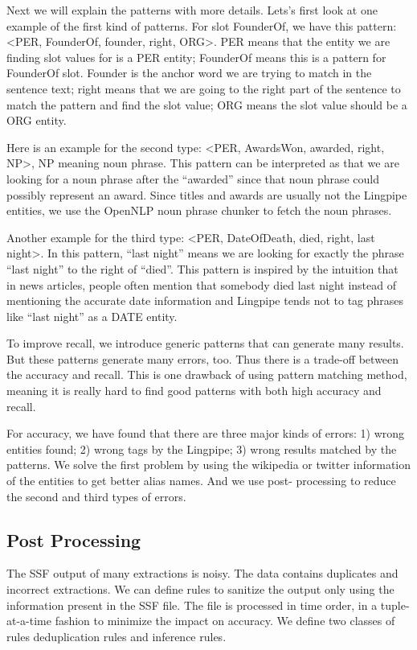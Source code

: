 Next we will explain the patterns with more details. Lets’s first look at one 
example of the first kind of patterns. For slot FounderOf, we have this
pattern: \textless PER, FounderOf, founder, right, ORG\textgreater. PER means 
that the entity we are finding slot values for is a PER entity; FounderOf 
means this is a pattern for FounderOf slot. Founder is the anchor word we are 
trying to match in the sentence text; right means that we are going to the 
right part of the sentence to match the pattern and find the slot value; ORG 
means the slot value should be a ORG entity.

Here is an example for the second type: \textless PER, AwardsWon, awarded, 
right, NP\textgreater, NP meaning noun phrase. This pattern can be interpreted 
as that we are looking for a noun phrase after the “awarded” since that noun 
phrase could possibly represent an award. Since titles and awards are usually 
not the Lingpipe entities, we use the OpenNLP noun phrase chunker to fetch the 
noun phrases.

Another example for the third type: \textless PER, DateOfDeath, died, right, 
last night\textgreater. In this pattern, “last night” means we are looking for 
exactly the phrase “last night” to the right of “died”. This pattern is 
inspired by the intuition that in news articles, people often mention that 
somebody died last night instead of mentioning the accurate date information 
and Lingpipe tends not to tag phrases like “last night” as a DATE entity. 

To improve recall, we introduce generic patterns that can generate many results.
But these patterns generate many errors, too. Thus there is a trade-off 
between the accuracy and recall. This is one drawback of using pattern 
matching method, meaning it is really hard to find good patterns with both 
high accuracy and recall. 

For accuracy, we have found that there are three major kinds of errors: 1) 
wrong entities found; 2) wrong tags by the Lingpipe; 3) wrong results matched 
by the patterns. We solve the first problem by using the wikipedia or twitter 
information of the entities to get better alias names. And we use
post- processing to reduce the second and third types of errors.

\subsection{Post Processing}

The SSF output of many extractions is noisy. The data contains duplicates and 
incorrect extractions. We can define rules to sanitize the output only using 
the information present in the SSF file. The file is processed in time order, 
in a tuple-at-a-time fashion to minimize the impact on accuracy. We define 
two classes of rules deduplication rules and inference rules.

